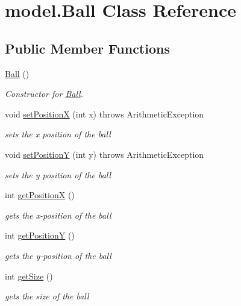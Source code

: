 \hypertarget{classmodel_1_1_ball}{}\section{model.\+Ball Class Reference}
\label{classmodel_1_1_ball}
\subsection*{Public Member Functions}
\begin{DoxyCompactItemize}
\item 
\hyperlink{classmodel_1_1_ball_a525ba73a7ce62c810a501d6194402cfc}{Ball} ()
\begin{DoxyCompactList}\small\item\em Constructor for \hyperlink{classmodel_1_1_ball}{Ball}. \end{DoxyCompactList}\item 
void \hyperlink{classmodel_1_1_ball_a14854352d44495abed0928ba16a0ac39}{set\+PositionX} (int x)  throws Arithmetic\+Exception 
\begin{DoxyCompactList}\small\item\em sets the x position of the ball \end{DoxyCompactList}\item 
void \hyperlink{classmodel_1_1_ball_a8902ffdc71a7845ec246fedf586649c7}{set\+PositionY} (int y)  throws Arithmetic\+Exception 
\begin{DoxyCompactList}\small\item\em sets the y position of the ball \end{DoxyCompactList}\item 
int \hyperlink{classmodel_1_1_ball_ad6a8f2229d4bdb3dd755443000eeacdf}{get\+PositionX} ()
\begin{DoxyCompactList}\small\item\em gets the x-\/position of the ball \end{DoxyCompactList}\item 
int \hyperlink{classmodel_1_1_ball_ae5509de430dc00bc02259294aa05c10d}{get\+PositionY} ()
\begin{DoxyCompactList}\small\item\em gets the y-\/position of the ball \end{DoxyCompactList}\item 
int \hyperlink{classmodel_1_1_ball_a46ca8051579a49ae750f965621534d5c}{get\+Size} ()
\begin{DoxyCompactList}\small\item\em gets the size of the ball \end{DoxyCompactList}\end{DoxyCompactItemize}
